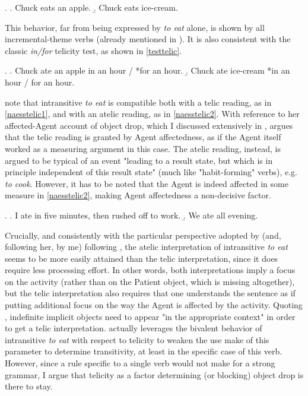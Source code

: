 \ex. \label{tennytelic} \a. \label{tennytelic1} Chuck eats an apple.
\b. \label{tennytelic2} Chuck eats ice-cream.

This behavior, far from being expressed by \textit{to eat} alone, is shown by all incremental-theme verbs (already mentioned in ). It is also consistent with the classic \textit{in/for} telicity test, as shown in \ref{testtelic}.

\ex. \label{testtelic} \a. \label{testtelic1} Chuck ate an apple in an hour / *for an hour.
\b. \label{testtelic2} Chuck ate ice-cream *in an hour / for an hour.

\textcite{Naess2007, Ruda2017, willim2006event, Naess2011} note that intransitive \textit{to eat} is compatible both with a telic reading, as in \ref{naesstelic1}, and with an atelic reading, as in \ref{naesstelic2}. With reference to her affected-Agent account of object drop, which I discussed extensively in , \textcite[78-79]{Naess2007} argues that the telic reading is granted by Agent affectedness, as if the Agent itself worked as a measuring argument in this case. The atelic reading, instead, is argued to be typical of an event "leading to a result state, but which is in principle independent of this result state" (much like  "habit-forming" verbs), e.g. \textit{to cook}. However, it has to be noted that the Agent is indeed affected in some measure in \ref{naesstelic2}, making Agent affectedness a non-decisive factor. 

\ex. \label{naesstelic} \a. \label{naesstelic1} I ate in five minutes, then rushed off to work.
\b. \label{naesstelic2} We ate all evening.

Crucially, and consistently with the particular perspective adopted by \textcite{Medina2007} (and, following her, by me) following \textcite{Olsen1997}, the atelic interpretation of intransitive \textit{to eat} seems to be more easily attained than the telic interpretation, since it does require less processing effort. In other words, both interpretations imply a focus on the activity (rather than on the Patient object, which is missing altogether), but the telic interpretation also requires that one understands the sentence as if putting additional focus on the way the Agent is affected by the activity. Quoting \textcite[4]{OlsenResnik1997}, indefinite implicit objects need to appear "in the appropriate context" in order to get a telic interpretation. \textcite[79]{Naess2007} actually leverages the bivalent behavior of intransitive \textit{to eat} with respect to telicity to weaken the use \textcite{HopperThompson1980} make of this parameter to determine transitivity, at least in the specific case of this verb. However, since a rule specific to a single verb would not make for a strong grammar, I argue that telicity as a factor determining (or blocking) object drop is there to stay.

